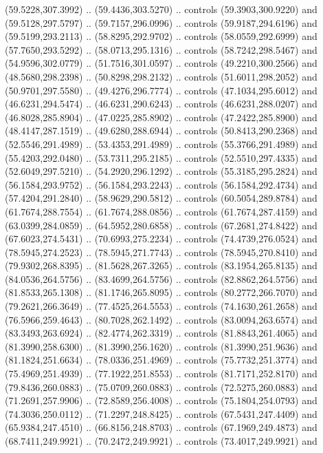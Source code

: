 \begin{scope}[cm={{1.25,0.0,0.0,-1.25,(0.0,743.43331)}}]
    (59.5228,307.3992) .. (59.4436,303.5270) .. controls (59.3903,300.9220) and
    (59.5128,297.5797) .. (59.7157,296.0996) .. controls (59.9187,294.6196) and
    (59.5199,293.2113) .. (58.8295,292.9702) .. controls (58.0559,292.6999) and
    (57.7650,293.5292) .. (58.0713,295.1316) .. controls (58.7242,298.5467) and
    (54.9596,302.0779) .. (51.7516,301.0597) .. controls (49.2210,300.2566) and
    (48.5680,298.2398) .. (50.8298,298.2132) .. controls (51.6011,298.2052) and
    (50.9701,297.5580) .. (49.4276,296.7774) .. controls (47.1034,295.6012) and
    (46.6231,294.5474) .. (46.6231,290.6243) .. controls (46.6231,288.0207) and
    (46.8028,285.8904) .. (47.0225,285.8902) .. controls (47.2422,285.8900) and
    (48.4147,287.1519) .. (49.6280,288.6944) .. controls (50.8413,290.2368) and
    (52.5546,291.4989) .. (53.4353,291.4989) .. controls (55.3766,291.4989) and
    (55.4203,292.0480) .. (53.7311,295.2185) .. controls (52.5510,297.4335) and
    (52.6049,297.5210) .. (54.2920,296.1292) .. controls (55.3185,295.2824) and
    (56.1584,293.9752) .. (56.1584,293.2243) .. controls (56.1584,292.4734) and
    (57.4204,291.2840) .. (58.9629,290.5812) .. controls (60.5054,289.8784) and
    (61.7674,288.7554) .. (61.7674,288.0856) .. controls (61.7674,287.4159) and
    (63.0399,284.0859) .. (64.5952,280.6858) .. controls (67.2681,274.8422) and
    (67.6023,274.5431) .. (70.6993,275.2234) .. controls (74.4739,276.0524) and
    (78.5945,274.2523) .. (78.5945,271.7743) .. controls (78.5945,270.8410) and
    (79.9302,268.8395) .. (81.5628,267.3265) .. controls (83.1954,265.8135) and
    (84.0536,264.5756) .. (83.4699,264.5756) .. controls (82.8862,264.5756) and
    (81.8533,265.1308) .. (81.1746,265.8095) .. controls (80.2772,266.7070) and
    (79.2621,266.3649) .. (77.4525,264.5553) .. controls (74.1630,261.2658) and
    (76.5966,259.4643) .. (80.7028,262.1492) .. controls (83.0094,263.6574) and
    (83.3493,263.6924) .. (82.4774,262.3319) .. controls (81.8843,261.4065) and
    (81.3990,258.6300) .. (81.3990,256.1620) .. controls (81.3990,251.9636) and
    (81.1824,251.6634) .. (78.0336,251.4969) .. controls (75.7732,251.3774) and
    (75.4969,251.4939) .. (77.1922,251.8553) .. controls (81.7171,252.8170) and
    (79.8436,260.0883) .. (75.0709,260.0883) .. controls (72.5275,260.0883) and
    (71.2691,257.9906) .. (72.8589,256.4008) .. controls (75.1804,254.0793) and
    (74.3036,250.0112) .. (71.2297,248.8425) .. controls (67.5431,247.4409) and
    (65.9384,247.4510) .. (66.8156,248.8703) .. controls (67.1969,249.4873) and
    (68.7411,249.9921) .. (70.2472,249.9921) .. controls (73.4017,249.9921) and

\end{scope}
